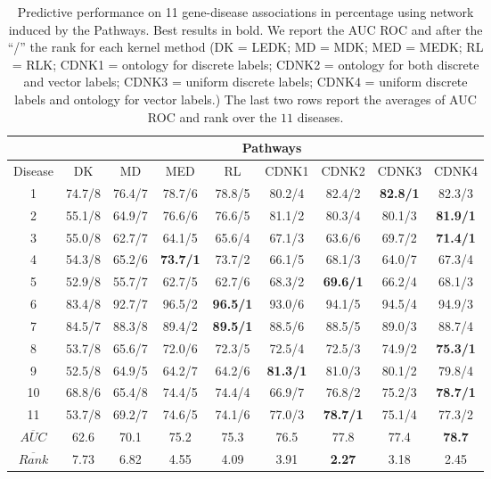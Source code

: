 \documentclass[review]{elsarticle}
\begin{document}
\begin{table}[h]
\caption{Predictive performance on 11 gene-disease associations in percentage using network induced by the Pathways. Best results in bold. We report the AUC ROC and after the ``/'' the rank for each kernel method (DK = LEDK; MD = MDK; MED = MEDK; RL = RLK; CDNK1 = ontology for discrete labels; CDNK2 = ontology for both discrete and vector labels; CDNK3 = uniform discrete labels;  CDNK4 = uniform discrete labels and ontology for vector labels.) The last two rows report the averages of AUC ROC and rank over the $11$ diseases.} \vspace{1em}
\centering
\setlength{\tabcolsep}{1mm}
\begin{tabular}{|c|c|c|c|c|c|c|c|c|}
\hline
         & \multicolumn{8}{c|}{\textbf{Pathways}} \\
 \hline
Disease & DK & MD & MED & RL & CDNK1 & CDNK2 & CDNK3 & CDNK4 \\

 \hline
1 & 74.7/8 & 76.4/7 & 78.7/6 & 78.8/5 & 80.2/4 & 82.4/2 & \textbf{82.8/1} & 82.3/3 \\

2 & 55.1/8 & 64.9/7 & 76.6/6 & 76.6/5 & 81.1/2 & 80.3/4 & 80.1/3 & \textbf{81.9/1} \\

3 & 55.0/8 & 62.7/7 & 64.1/5 & 65.6/4 & 67.1/3 & 63.6/6 & 69.7/2 & \textbf{71.4/1} \\

4 & 54.3/8 & 65.2/6 & \textbf{73.7/1} & 73.7/2 & 66.1/5 & 68.1/3 & 64.0/7 & 67.3/4 \\

5 & 52.9/8 & 55.7/7 & 62.7/5 & 62.7/6 & 68.3/2 & \textbf{69.6/1} & 66.2/4 & 68.1/3 \\

6 & 83.4/8 & 92.7/7 & 96.5/2 & \textbf{96.5/1} & 93.0/6 & 94.1/5 & 94.5/4 & 94.9/3 \\

7 & 84.5/7 & 88.3/8 & 89.4/2 & \textbf{89.5/1} & 88.5/6 & 88.5/5 & 89.0/3 & 88.7/4 \\

8 & 53.7/8 & 65.6/7 & 72.0/6 & 72.3/5 & 72.5/4 & 72.5/3 & 74.9/2 & \textbf{75.3/1} \\

9 & 52.5/8 & 64.9/5 & 64.2/7 & 64.2/6 & \textbf{81.3/1} & 81.0/3 & 80.1/2 & 79.8/4 \\

10 & 68.8/6 & 65.4/8 & 74.4/5 & 74.4/4 & 66.9/7 & 76.8/2 & 75.2/3 & \textbf{78.7/1} \\

11 & 53.7/8 & 69.2/7 & 74.6/5 & 74.1/6 & 77.0/3 & \textbf{78.7/1} & 75.1/4 & 77.3/2 \\

\hline
$\overline{AUC}$ & 62.6	& 70.1 & 75.2 & 75.3 & 76.5 & 77.8 & 77.4 &	\textbf{78.7}
 \\
$\overline{Rank}$ & 7.73 & 6.82 & 4.55 & 4.09 & 3.91 & \textbf{2.27} & 3.18 & 2.45 \\
 \hline 
\end{tabular}
\label{tab:cdnk-pathways}
\end{table}
\end{document}
